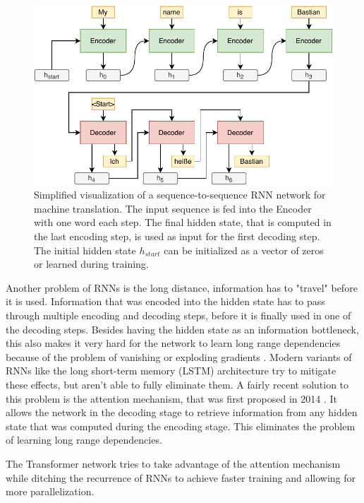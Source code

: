 \begin{figure}[h]
\centering
\includegraphics{figures/rnn-visualization}
\caption[Simplified visualization of a sequence-to-sequence RNN network for machine translation]{Simplified visualization of a sequence-to-sequence RNN network for machine translation. The input sequence is fed into the Encoder with one word each step. The final hidden state, that is computed in the last encoding step, is used as input for the first decoding step. The initial hidden state $h_{start}$ can be initialized as a vector of zeros or learned during training.}
\label{fig:rnn-visualization}
\end{figure}

Another problem of RNNs is the long distance, information has to "travel" before it is used.
Information that was encoded into the hidden state has to pass through multiple encoding and decoding steps, before it is finally used in one of the decoding steps.
Besides having the hidden state as an information bottleneck, this also makes it very hard for the network to learn long range dependencies because of the problem of vanishing or exploding gradients \cite{Hochreiter01gradientflow}.
Modern variants of RNNs like the long short-term memory (LSTM) architecture \cite{Hochreiter1997} try to mitigate these effects, but aren't able to fully eliminate them.
A fairly recent solution to this problem is the attention mechanism, that was first proposed in 2014 \cite{1409.0473}.
It allows the network in the decoding stage to retrieve information from any hidden state that was computed during the encoding stage.
This eliminates the problem of learning long range dependencies.

The Transformer network tries to take advantage of the attention mechanism while ditching the recurrence of RNNs to achieve faster training and allowing for more parallelization.

